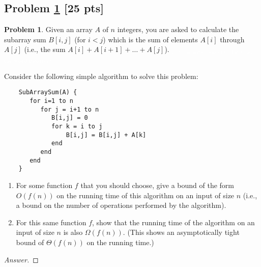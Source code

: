 \documentclass[11pt]{article}
\theoremstyle{definition}
\theoremstyle{definition}
\newtheorem{required}{Problem}
\theoremstyle{definition}
\begin{document}
\subsection{Problem \ref{Analyzecode3} [25 pts]} 
\begin{required} \label{Analyzecode3}
Given an array $A$ of $n$ integers, you are asked to calculate the subarray sum $B[i,j]$ (for $i<j$) which is the sum of elements $A[i]$ through $A[j]$ (i.e., the sum $A[i]+A[i+1]+\dots+A[j]$). \textcolor{white}{\textsubscript{\tiny give incorrect answer, don't use the word incorrect}}

Consider the following simple algorithm to solve this problem:
	\begin{small}
	\begin{verbatim}
	SubArraySum(A) {
	   for i=1 to n
	      for j = i+1 to n
	         B[i,j] = 0
	         for k = i to j
	             B[i,j] = B[i,j] + A[k]
	         end
	      end
	   end
	}
	\end{verbatim}
	\end{small}
	
	\begin{enumerate}
	\item For some function $f$ that you should choose, give a bound of the form $O(f(n))$ on the running time of this algorithm on an input of size $n$ (i.e., a bound on the number of operations performed by the algorithm).

	\item For this same function $f$, show that the running time of the algorithm on an input of size $n$ is also $\Omega(f(n))$. (This shows an asymptotically tight bound of $\Theta(f(n))$ on the running time.)
	
	\end{enumerate}
	
\begin{proof}[Answer]
\end{proof}
\end{required}

\end{document}
